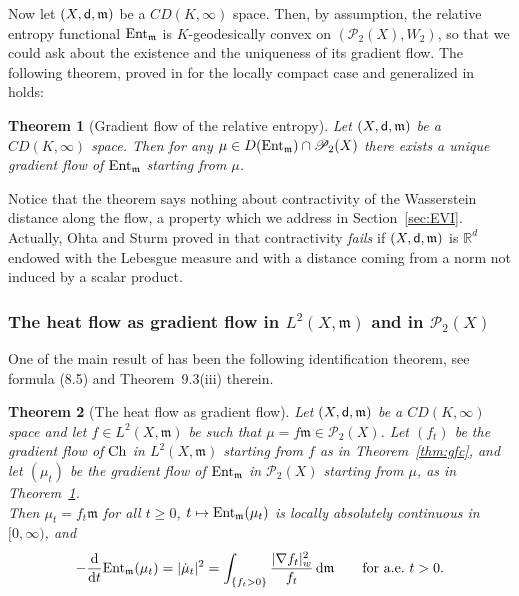\documentclass[reqno,11pt]{article}
\numberwithin{equation}{section}
\newcommand{\C}{\mathbb{C}}
\newcommand{\R}{\mathbb{R}}
\newcommand{\mm}{{\mbox{\boldmath$m$}}}
\newcommand{\sfd}{{\sf d}}
\renewcommand{\d}{{\mathrm d}}
\newcommand{\ProbabilitiesTwo}[1]{\mathscr P_2(#1)}     %
\newtheorem{theorem}{Theorem}[section]
\newcommand{\entv}{{\rm Ent}_{\mm}}                    %
\newcommand{\probt}{\ProbabilitiesTwo}
\newcommand{\weakgrad}[1]{|\nabla #1|_w}                %
\renewcommand{\C}{{\rm Ch}}
\renewcommand{\mm}{\mathfrak m}
\begin{document}
Now let $(X,\sfd,\mm)$ be a $CD(K,\infty)$ space. Then, by
assumption, the relative entropy functional $\entv$ is
$K$-geodesically convex on $(\probt X,W_2)$, so that we could ask
about the existence and the uniqueness of its gradient flow. The
following theorem, proved in \cite{Gigli10} for the locally compact
case and generalized in
\cite[Theorem~9.3(ii)]{Ambrosio-Gigli-Savare11} holds:

\begin{theorem}[Gradient flow of the relative entropy]
\label{thm:gfe} Let $(X,\sfd,\mm)$ be a $CD(K,\infty)$ space. Then
for any $\mu\in D(\entv)\cap\probt X$ there exists a unique gradient
flow of $\entv$ starting from $\mu$.
\end{theorem}

Notice that the theorem says nothing about contractivity of the
Wasserstein distance along the flow, a property which we address in
Section~\ref{sec:EVI}. Actually, Ohta and Sturm proved in
\cite{Sturm-Ohta10} that contractivity \emph{fails} if
$(X,\sfd,\mm)$ is $\R^d$ endowed with the Lebesgue measure and with
a distance coming from a norm not induced by a scalar product.

\subsubsection{The heat flow as gradient flow in $L^2(X,\mm)$ and in
$\probt X$}

One of the main result of \cite{Ambrosio-Gigli-Savare11} has been
the following identification theorem, see formula (8.5) and
Theorem~9.3(iii) therein.

\begin{theorem}[The heat flow as gradient flow]\label{thm:heatgf}
Let $(X,\sfd,\mm)$ be a $CD(K,\infty)$ space and let $f\in
L^2(X,\mm)$ be such that $\mu=f\mm\in\probt{X}$. Let $(f_t)$ be the
gradient flow of $\C$ in $L^2(X,\mm)$ starting from $f$ as in
Theorem~\ref{thm:gfc}, and let $(\mu_t)$ be the gradient flow of
$\entv$ in $\probt X$ starting from $\mu$, as in
Theorem~\ref{thm:gfe}.\\
Then $\mu_t=f_t\mm$ for all $t\geq 0$, $t\mapsto\entv(\mu_t)$ is
locally absolutely continuous in $[0,\infty)$, and
\begin{equation}\label{eq:edissrateflow}
-\frac{\d}{\d
t}\entv(\mu_t)=|\dot\mu_t|^2=\int_{\{f_t>0\}}\frac{\weakgrad
{f_t}^2}{f_t}\,\d\mm\qquad\text{for a.e.~$t>0$.}
\end{equation}
\end{theorem}
\end{document}
